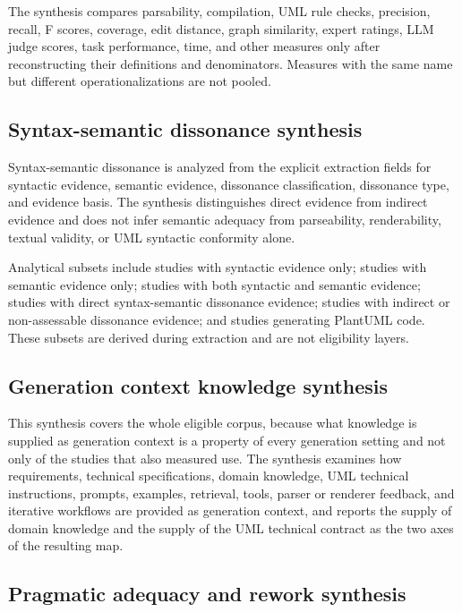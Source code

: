The synthesis compares parsability, compilation, UML rule checks, precision, recall, F scores, coverage, edit distance, graph similarity, expert ratings, LLM judge scores, task performance, time, and other measures only after reconstructing their definitions and denominators. Measures with the same name but different operationalizations are not pooled.

\subsection{Syntax-semantic dissonance synthesis}

Syntax-semantic dissonance is analyzed from the explicit extraction fields for syntactic evidence, semantic evidence, dissonance classification, dissonance type, and evidence basis. The synthesis distinguishes direct evidence from indirect evidence and does not infer semantic adequacy from parseability, renderability, textual validity, or UML syntactic conformity alone.

Analytical subsets include studies with syntactic evidence only; studies with semantic evidence only; studies with both syntactic and semantic evidence; studies with direct syntax-semantic dissonance evidence; studies with indirect or non-assessable dissonance evidence; and studies generating PlantUML code. These subsets are derived during extraction and are not eligibility layers.

\subsection{Generation context knowledge synthesis}

This synthesis covers the whole eligible corpus, because what knowledge is supplied as generation context is a property of every generation setting and not only of the studies that also measured use. The synthesis examines how requirements, technical specifications, domain knowledge, UML technical instructions, prompts, examples, retrieval, tools, parser or renderer feedback, and iterative workflows are provided as generation context, and reports the supply of domain knowledge and the supply of the UML technical contract as the two axes of the resulting map.

\subsection{Pragmatic adequacy and rework synthesis}

